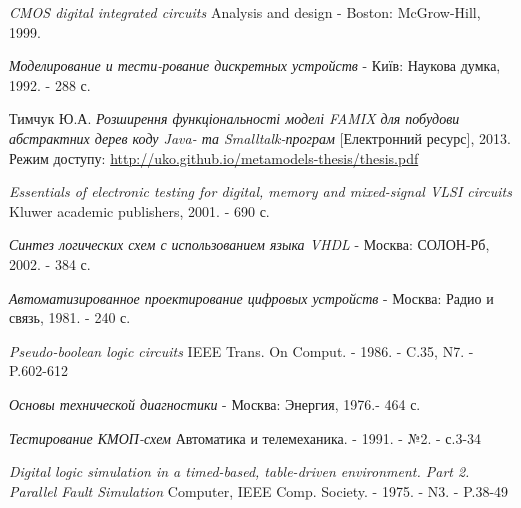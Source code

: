 \documentclass[12pt,a4paper]{article}
\begin{document}
\begin{thebibliography}{9}
  \emph{CMOS digital integrated circuits}
    Analysis and design - Boston: McGrow-Hill, 1999.

  \emph{Моделирование и тести-рование дискретных устройств}
     - Київ: Наукова думка, 1992. - 288 с.

  Тимчук Ю.А. \emph{Розширення функціональності моделі FAMIX для побудови
абстрактних дерев коду Java- та Smalltalk-програм}
    [Електронний ресурс], 2013. Режим доступу:
    \url{http://uko.github.io/metamodels-thesis/thesis.pdf}

  \emph{Essentials of electronic testing for digital, memory and mixed-signal VLSI circuits}
    Kluwer academic publishers, 2001. - 690 с.

  \emph{Синтез логических схем с использованием языка VHDL}
     - Москва: СОЛОН-Рб, 2002. - 384 с.

  \emph{Автоматизированное проектирование цифровых устройств}
     - Москва: Радио и связь, 1981. - 240 с.

  \emph{Pseudo-boolean logic circuits}
    IEEE Trans. On Comput. - 1986. - C.35, N7. - P.602-612

  \emph{Основы технической диагностики}
     - Москва: Энергия, 1976.- 464 с.

  \emph{Тестирование КМОП-схем}
    Автоматика и телемеханика. - 1991. - №2. - с.3-34

  \emph{Digital logic simulation in a timed-based, table-driven environment. Part 2. Parallel Fault Simulation}
    Computer, IEEE Comp. Society. - 1975. - N3. - P.38-49

\end{thebibliography}
\end{document}
